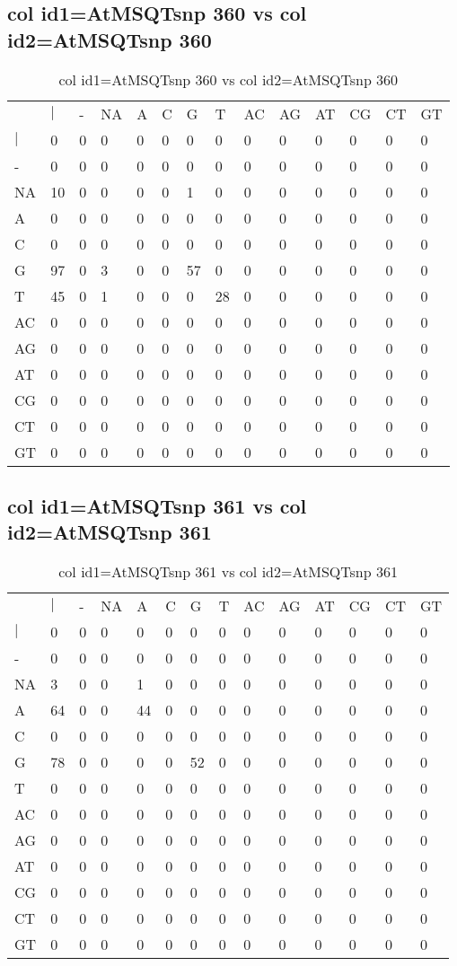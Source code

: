 \subsection{col id1=AtMSQTsnp 360 vs col id2=AtMSQTsnp 360}
\begin{center}
\begin{longtable}{|l|l|l|l|l|l|l|l|l|l|l|l|l|l|}
\caption{col id1=AtMSQTsnp 360 vs col id2=AtMSQTsnp 360} \label{table_dm680}\\
\hline
\\
\hline
&$|$&-&NA&A&C&G&T&AC&AG&AT&CG&CT&GT\\
$|$&0&0&0&0&0&0&0&0&0&0&0&0&0\\
-&0&0&0&0&0&0&0&0&0&0&0&0&0\\
NA&10&0&0&0&0&1&0&0&0&0&0&0&0\\
A&0&0&0&0&0&0&0&0&0&0&0&0&0\\
C&0&0&0&0&0&0&0&0&0&0&0&0&0\\
G&97&0&3&0&0&57&0&0&0&0&0&0&0\\
T&45&0&1&0&0&0&28&0&0&0&0&0&0\\
AC&0&0&0&0&0&0&0&0&0&0&0&0&0\\
AG&0&0&0&0&0&0&0&0&0&0&0&0&0\\
AT&0&0&0&0&0&0&0&0&0&0&0&0&0\\
CG&0&0&0&0&0&0&0&0&0&0&0&0&0\\
CT&0&0&0&0&0&0&0&0&0&0&0&0&0\\
GT&0&0&0&0&0&0&0&0&0&0&0&0&0\\
\hline
\end{longtable}
\end{center}

\subsection{col id1=AtMSQTsnp 361 vs col id2=AtMSQTsnp 361}
\begin{center}
\begin{longtable}{|l|l|l|l|l|l|l|l|l|l|l|l|l|l|}
\caption{col id1=AtMSQTsnp 361 vs col id2=AtMSQTsnp 361} \label{table_dm682}\\
\hline
\\
\hline
&$|$&-&NA&A&C&G&T&AC&AG&AT&CG&CT&GT\\
$|$&0&0&0&0&0&0&0&0&0&0&0&0&0\\
-&0&0&0&0&0&0&0&0&0&0&0&0&0\\
NA&3&0&0&1&0&0&0&0&0&0&0&0&0\\
A&64&0&0&44&0&0&0&0&0&0&0&0&0\\
C&0&0&0&0&0&0&0&0&0&0&0&0&0\\
G&78&0&0&0&0&52&0&0&0&0&0&0&0\\
T&0&0&0&0&0&0&0&0&0&0&0&0&0\\
AC&0&0&0&0&0&0&0&0&0&0&0&0&0\\
AG&0&0&0&0&0&0&0&0&0&0&0&0&0\\
AT&0&0&0&0&0&0&0&0&0&0&0&0&0\\
CG&0&0&0&0&0&0&0&0&0&0&0&0&0\\
CT&0&0&0&0&0&0&0&0&0&0&0&0&0\\
GT&0&0&0&0&0&0&0&0&0&0&0&0&0\\
\hline
\end{longtable}
\end{center}

